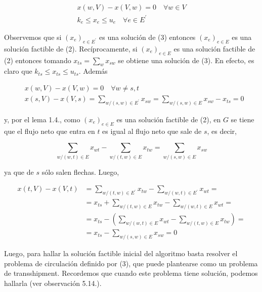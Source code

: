 \documentclass[10pt]{article}
\begin{document}
\[
\begin{array}{r}
x(w, V)-x(V, w)=0 \quad \forall w \in V \\
k_{e} \leq x_{e} \leq u_{e} \quad \forall e \in E^{\prime} \tag{3}
\end{array}
\]

Observemos que si $\left(x_{e}\right)_{e \in E^{\prime}}$ es una solución de (3) entonces $\left(x_{e}\right)_{e \in E}$ es una solución factible de (2). Recíprocamente, si $\left(x_{e}\right)_{e \in E}$ es una solución factible de (2) entonces tomando $x_{t s}=\sum_{w} x_{s w}$ se obtiene una solución de (3). En efecto, es claro que $k_{t s} \leq x_{t s} \leq u_{t s}$. Además

$$
\begin{aligned}
& x(w, V)-x(V, w)=0 \quad \forall w \neq s, t \\
& x(s, V)-x(V, s)=\sum_{w /(s, w) \in E^{\prime}} x_{s w}=\sum_{w /(s, w) \in E} x_{s w}-x_{t s}=0
\end{aligned}
$$

y, por el lema 1.4., como $\left(x_{e}\right)_{e \in E}$ es una solución factible de (2), en $G$ se tiene que el flujo neto que entra en $t$ es igual al flujo neto que sale de $s$, es decir,

$$
\sum_{w /(w, t) \in E} x_{w t}-\sum_{w /(t, w) \in E} x_{t w}=\sum_{w /(s, w) \in E} x_{s w}
$$

ya que de $s$ sólo salen flechas. Luego,

$$
\begin{aligned}
x(t, V)-x(V, t) & =\sum_{w /(t, w) \in E^{\prime}} x_{t w}-\sum_{w /(w, t) \in E^{\prime}} x_{w t}= \\
& =x_{t s}+\sum_{w /(t, w) \in E} x_{t w}-\sum_{w /(w, t) \in E} x_{w t}= \\
& =x_{t s}-\left(\sum_{w /(w, t) \in E} x_{w t}-\sum_{w /(t, w) \in E} x_{t w}\right)= \\
& =x_{t s}-\sum_{w /(s, w) \in E} x_{s w}=0
\end{aligned}
$$

Luego, para hallar la solución factible inicial del algoritmo basta resolver el problema de circulación definido por (3), que puede plantearse como un problema de transshipment. Recordemos que cuando este problema tiene solución, podemos hallarla (ver observación 5.14.).
\end{document}
